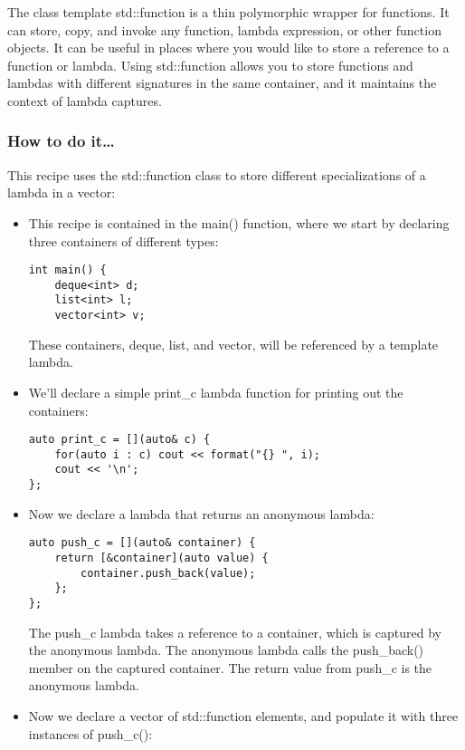 
The class template std::function is a thin polymorphic wrapper for functions. It can store, copy, and invoke any function, lambda expression, or other function objects. It can be useful in places where you would like to store a reference to a function or lambda. Using std::function allows you to store functions and lambdas with different signatures in the same container, and it maintains the context of lambda captures.

\subsubsection{How to do it…}

This recipe uses the std::function class to store different specializations of a lambda in a vector:

\begin{itemize}
\item 
This recipe is contained in the main() function, where we start by declaring three containers of different types:

\begin{lstlisting}[style=styleCXX]
int main() {
	deque<int> d;
	list<int> l;
	vector<int> v;
\end{lstlisting}

These containers, deque, list, and vector, will be referenced by a template lambda.

\item 
We'll declare a simple print\_c lambda function for printing out the containers:

\begin{lstlisting}[style=styleCXX]
auto print_c = [](auto& c) {
	for(auto i : c) cout << format("{} ", i);
	cout << '\n';
};
\end{lstlisting}

\item 
Now we declare a lambda that returns an anonymous lambda:

\begin{lstlisting}[style=styleCXX]
auto push_c = [](auto& container) {
	return [&container](auto value) {
		container.push_back(value);
	};
};
\end{lstlisting}

The push\_c lambda takes a reference to a container, which is captured by the anonymous lambda. The anonymous lambda calls the push\_back() member on the captured container. The return value from push\_c is the anonymous lambda.

\item 
Now we declare a vector of std::function elements, and populate it with three instances of push\_c():


\end{itemize}
